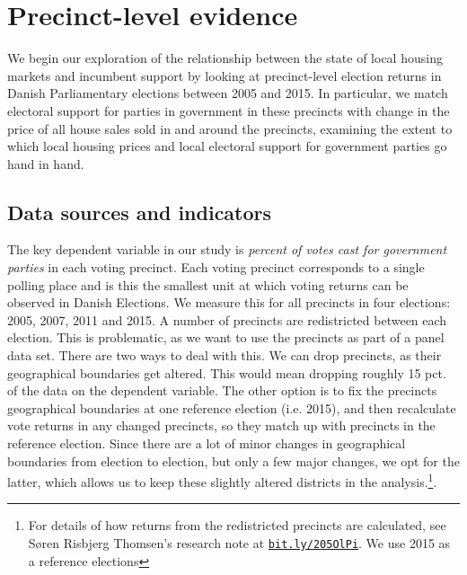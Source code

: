 \documentclass[12pt,a4paper]{article}
\begin{document}


\section{Precinct-level evidence}\label{precinctlevel}
We begin our exploration of the relationship between the state of local housing markets and incumbent support by looking at precinct-level election returns in Danish Parliamentary elections between 2005 and 2015. In particular, we match electoral support for parties in government in these precincts with change in the price of all house sales sold in and around the precincts, examining the extent to which local housing prices and local electoral support for government parties go hand in hand.

\subsection{Data sources and indicators}
The key dependent variable in our study is \textit{percent of votes cast for government parties} in each voting precinct. Each voting precinct corresponds to a single polling place and is this the smallest unit at which voting returns can be observed in Danish Elections. We measure this for all precincts in four elections:  2005, 2007, 2011 and 2015. A number of precincts are redistricted between each election. This is problematic, as we want to use  the precincts as part of a panel data set. There are two ways to deal with this. We can drop precincts, as their geographical boundaries get altered. This would mean dropping roughly 15 pct. of the data on the dependent variable. The other option is to fix the precincts geographical boundaries at one reference election (i.e. 2015), and then recalculate vote returns in any changed precincts, so they match up with precincts in the reference election. Since there are a lot of minor changes in geographical boundaries from election to election, but only a few major changes, we opt for the latter, which allows us to keep these slightly altered districts in the analysis.\footnote{For details of how returns from the redistricted precincts are calculated, see Søren Risbjerg Thomsen's research note at \texttt{\href{http://bit.ly/205OlPi}{bit.ly/205OlPi}}.  We use 2015 as a reference elections}. 
\end{document}
